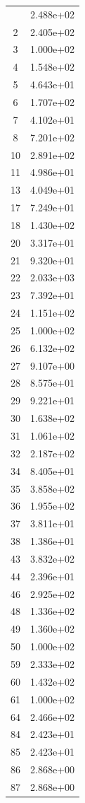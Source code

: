 \documentclass[12pt]{article}
\begin{document}
\begin{longtable}{@{}cc@{}}
\bottomrule
\endlastfoot
1 & 2.488e+02 \\
2 & 2.405e+02 \\
3 & 1.000e+02 \\
4 & 1.548e+02 \\
5 & 4.643e+01 \\
6 & 1.707e+02 \\
7 & 4.102e+01 \\
8 & 7.201e+02 \\
10 & 2.891e+02 \\
11 & 4.986e+01 \\
13 & 4.049e+01 \\
17 & 7.249e+01 \\
18 & 1.430e+02 \\
20 & 3.317e+01 \\
21 & 9.320e+01 \\
22 & 2.033e+03 \\
23 & 7.392e+01 \\
24 & 1.151e+02 \\
25 & 1.000e+02 \\
26 & 6.132e+02 \\
27 & 9.107e+00 \\
28 & 8.575e+01 \\
29 & 9.221e+01 \\
30 & 1.638e+02 \\
31 & 1.061e+02 \\
32 & 2.187e+02 \\
34 & 8.405e+01 \\
35 & 3.858e+02 \\
36 & 1.955e+02 \\
37 & 3.811e+01 \\
38 & 1.386e+01 \\
43 & 3.832e+02 \\
44 & 2.396e+01 \\
46 & 2.925e+02 \\
48 & 1.336e+02 \\
49 & 1.360e+02 \\
50 & 1.000e+02 \\
59 & 2.333e+02 \\
60 & 1.432e+02 \\
61 & 1.000e+02 \\
64 & 2.466e+02 \\
84 & 2.423e+01 \\
85 & 2.423e+01 \\
86 & 2.868e+00 \\
87 & 2.868e+00 \\

\end{longtable}
\end{document}

